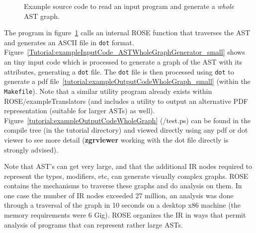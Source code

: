 \begin{figure}[!h]
{\indent
{\mySmallFontSize

\begin{latexonly}
   
\end{latexonly}

\begin{htmlonly}
   
\end{htmlonly}

}
}
\caption{Example source code to read an input program and generate a {\em whole} AST graph.}
\label{Tutorial:exampleASTWholeGraphGenerator}
\end{figure}

The program in figure~\ref{Tutorial:exampleASTWholeGraphGenerator} calls 
an internal ROSE function that traverses the AST and generates 
an ASCII file in {\tt dot} format.
Figure~\ref{Tutorial:exampleInputCode_ASTWholeGraphGenerator_small} shows an tiny input
code which is processed to generate a graph of the AST with its attributes, generating a 
{\tt dot} file.   The {\tt dot} file is then processed
using {\tt dot} to generate a pdf file~\ref{tutorial:exampleOutputCodeWholeGraph_small}
(within the {\tt Makefile}).
Note that a similar utility program already exists within ROSE/exampleTranslators
(and includes a utility to output an alternative PDF representation 
(suitable for larger ASTs) as well).  Figure~\ref{tutorial:exampleOutputCodeWholeGraph}
(\TutorialExampleBuildDirectory/test.ps) can be found in the compile 
tree (in the tutorial directory) and viewed directly using 
any pdf or dot viewer to see more detail ({\bf zgrviewer} working with
the dot file directly is strongly advised).

   Note that AST's can get very large, and that the additional IR nodes required to
represent the types, modifiers, etc, can generate visually complex graphs. ROSE
contains the mechanisms to traverse these graphs and do analysis on them.  In
one case the number of IR nodes exceeded 27 million, an analysis was done through
a traversal of the graph in 10 seconds on a desktop x86 machine (the memory requirements
were 6 Gig).  ROSE organizes the IR in ways that permit analysis of programs that can 
represent rather large ASTs.


